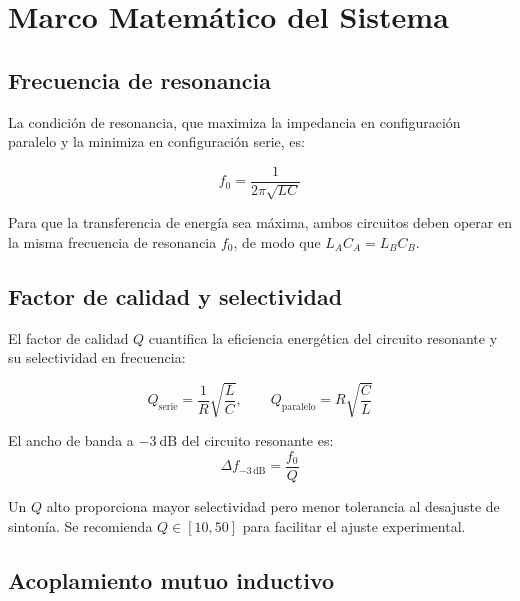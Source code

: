 \documentclass[11pt,a4paper]{article}
\begin{document}
\section{Marco Matemático del Sistema}

\subsection{Frecuencia de resonancia}

La condición de resonancia, que maximiza la impedancia en configuración paralelo y
la minimiza en configuración serie, es:

\begin{formulabox}
\begin{equation}
  f_0 = \frac{1}{2\pi\sqrt{LC}}
  \label{eq:resonancia}
\end{equation}
\end{formulabox}

Para que la transferencia de energía sea máxima, ambos circuitos deben operar en la misma
frecuencia de resonancia $f_0$, de modo que $L_A C_A = L_B C_B$.

\subsection{Factor de calidad y selectividad}

El factor de calidad $Q$ cuantifica la eficiencia energética del circuito resonante y su
selectividad en frecuencia:

\begin{equation}
  Q_{\text{serie}} = \frac{1}{R}\sqrt{\frac{L}{C}}, \qquad
  Q_{\text{paralelo}} = R\sqrt{\frac{C}{L}}
  \label{eq:Qfactor}
\end{equation}

El ancho de banda a $-\SI{3}{\dB}$ del circuito resonante es:
\begin{equation}
  \Delta f_{-3\,\text{dB}} = \frac{f_0}{Q}
  \label{eq:BW}
\end{equation}

Un $Q$ alto proporciona mayor selectividad pero menor tolerancia al desajuste de sintonía.
Se recomienda $Q \in [10, 50]$ para facilitar el ajuste experimental.

\subsection{Acoplamiento mutuo inductivo}
\end{document}
